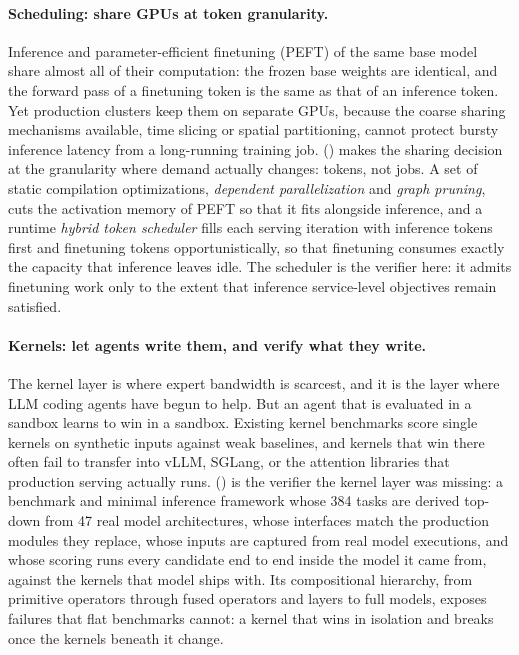 \paragraph{Scheduling: share GPUs at token granularity.}
Inference and parameter-efficient finetuning (PEFT) of the same base model share almost all of their computation: the frozen base weights are identical, and the forward pass of a finetuning token is the same as that of an inference token.
Yet production clusters keep them on separate GPUs, because the coarse sharing mechanisms available, time slicing or spatial partitioning, cannot protect bursty inference latency from a long-running training job.
\FlexLLM () makes the sharing decision at the granularity where demand actually changes: tokens, not jobs.
A set of static compilation optimizations, \emph{dependent parallelization} and \emph{graph pruning}, cuts the activation memory of PEFT so that it fits alongside inference, and a runtime \emph{hybrid token scheduler} fills each serving iteration with inference tokens first and finetuning tokens opportunistically, so that finetuning consumes exactly the capacity that inference leaves idle.
The scheduler is the verifier here: it admits finetuning work only to the extent that inference service-level objectives remain satisfied.

\paragraph{Kernels: let agents write them, and verify what they write.}
The kernel layer is where expert bandwidth is scarcest, and it is the layer where LLM coding agents have begun to help.
But an agent that is evaluated in a sandbox learns to win in a sandbox.
Existing kernel benchmarks score single kernels on synthetic inputs against weak baselines, and kernels that win there often fail to transfer into vLLM, SGLang, or the attention libraries that production serving actually runs.
\FastKernels () is the verifier the kernel layer was missing: a benchmark and minimal inference framework whose 384 tasks are derived top-down from 47 real model architectures, whose interfaces match the production modules they replace, whose inputs are captured from real model executions, and whose scoring runs every candidate end to end inside the model it came from, against the kernels that model ships with.
Its compositional hierarchy, from primitive operators through fused operators and layers to full models, exposes failures that flat benchmarks cannot: a kernel that wins in isolation and breaks once the kernels beneath it change.

